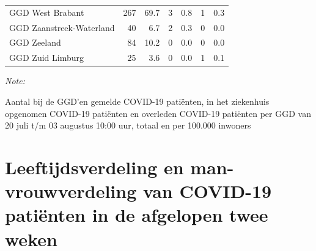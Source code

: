 \documentclass[
  english,
  man,floatsintext]{apa6}
\begin{document}
\begin{table}[H]
\begin{threeparttable}
\begin{tabular}{lrrrrrr}
GGD West Brabant & 267 & 69.7 & 3 & 0.8 & 1 & 0.3\\
GGD Zaanstreek-Waterland & 40 & 6.7 & 2 & 0.3 & 0 & 0.0\\
GGD Zeeland & 84 & 10.2 & 0 & 0.0 & 0 & 0.0\\
GGD Zuid Limburg & 25 & 3.6 & 0 & 0.0 & 1 & 0.1\\
\bottomrule
\end{tabular}
\begin{tablenotes}
\item \textit{Note: } 
\item Aantal bij de GGD’en gemelde COVID-19 patiënten, in het ziekenhuis opgenomen COVID-19 patiënten en overleden COVID-19 patiënten per GGD van 20 juli t/m 03 augustus 10:00 uur, totaal en per 100.000 inwoners
\end{tablenotes}
\end{threeparttable}
\endgroup{}
\end{table}

\newpage

\hypertarget{leeftijdsverdeling-en-man-vrouwverdeling-van-covid-19-patiuxebnten-in-de-afgelopen-twee-weken}{%
\section{Leeftijdsverdeling en man-vrouwverdeling van COVID-19 patiënten in de afgelopen twee weken}\label{leeftijdsverdeling-en-man-vrouwverdeling-van-covid-19-patiuxebnten-in-de-afgelopen-twee-weken}}
\end{document}

